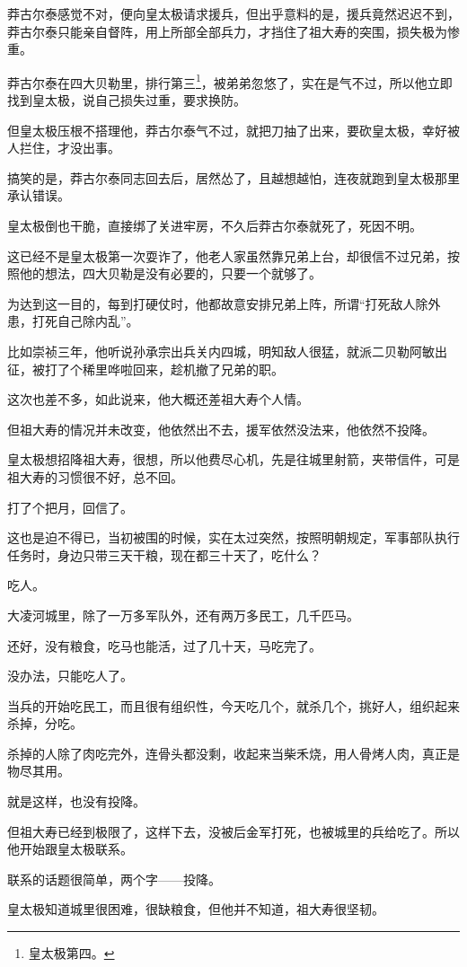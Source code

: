 \begin{multicols}{\theparacolNo}
莽古尔泰感觉不对，便向皇太极请求援兵，但出乎意料的是，援兵竟然迟迟不到，莽古尔泰只能亲自督阵，用上所部全部兵力，才挡住了祖大寿的突围，损失极为惨重。

莽古尔泰在四大贝勒里，排行第三\footnote{皇太极第四。}，被弟弟忽悠了，实在是气不过，所以他立即找到皇太极，说自己损失过重，要求换防。

但皇太极压根不搭理他，莽古尔泰气不过，就把刀抽了出来，要砍皇太极，幸好被人拦住，才没出事。

搞笑的是，莽古尔泰同志回去后，居然怂了，且越想越怕，连夜就跑到皇太极那里承认错误。

皇太极倒也干脆，直接绑了关进牢房，不久后莽古尔泰就死了，死因不明。

这已经不是皇太极第一次耍诈了，他老人家虽然靠兄弟上台，却很信不过兄弟，按照他的想法，四大贝勒是没有必要的，只要一个就够了。

为达到这一目的，每到打硬仗时，他都故意安排兄弟上阵，所谓“打死敌人除外患，打死自己除内乱”。

比如崇祯三年，他听说孙承宗出兵关内四城，明知敌人很猛，就派二贝勒阿敏出征，被打了个稀里哗啦回来，趁机撤了兄弟的职。

这次也差不多，如此说来，他大概还差祖大寿个人情。

但祖大寿的情况并未改变，他依然出不去，援军依然没法来，他依然不投降。

皇太极想招降祖大寿，很想，所以他费尽心机，先是往城里射箭，夹带信件，可是祖大寿的习惯很不好，总不回。

打了个把月，回信了。

这也是迫不得已，当初被围的时候，实在太过突然，按照明朝规定，军事部队执行任务时，身边只带三天干粮，现在都三十天了，吃什么？

吃人。

大凌河城里，除了一万多军队外，还有两万多民工，几千匹马。

还好，没有粮食，吃马也能活，过了几十天，马吃完了。

没办法，只能吃人了。

当兵的开始吃民工，而且很有组织性，今天吃几个，就杀几个，挑好人，组织起来杀掉，分吃。

杀掉的人除了肉吃完外，连骨头都没剩，收起来当柴禾烧，用人骨烤人肉，真正是物尽其用。

就是这样，也没有投降。

但祖大寿已经到极限了，这样下去，没被后金军打死，也被城里的兵给吃了。所以他开始跟皇太极联系。

联系的话题很简单，两个字——投降。

皇太极知道城里很困难，很缺粮食，但他并不知道，祖大寿很坚韧。


\end{multicols}
